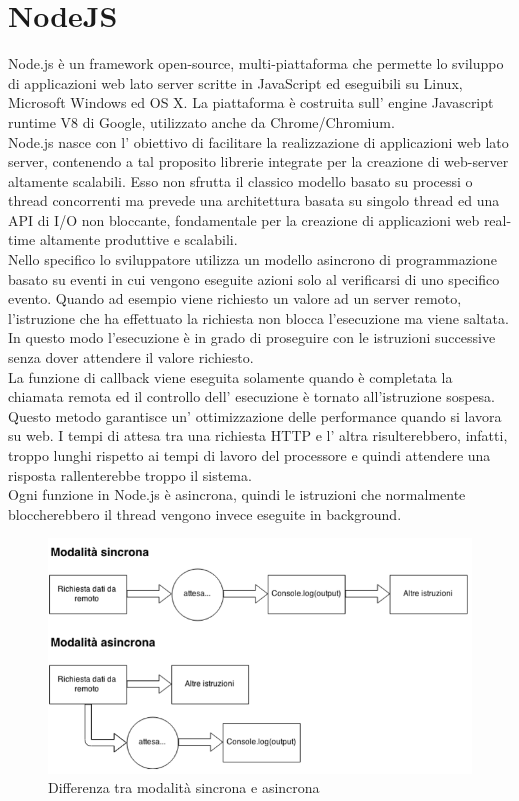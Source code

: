 \section{NodeJS}
\label{sec:chapter_tecnologie_abilitanti_nodejs}

Node.js è un framework open-source, multi-piattaforma che permette lo sviluppo di applicazioni web lato server scritte in JavaScript ed eseguibili su Linux, Microsoft Windows ed OS X.
La piattaforma è costruita sull’ engine Javascript runtime V8 di Google, utilizzato anche da Chrome/Chromium.
\\
Node.js nasce con l’ obiettivo di facilitare la realizzazione di applicazioni web lato server, contenendo a tal proposito librerie integrate per la creazione di web-server altamente scalabili.
Esso non sfrutta il classico modello basato su processi o thread concorrenti ma prevede una architettura basata su singolo thread ed una API di I/O non bloccante, fondamentale per la creazione di applicazioni web real-time altamente produttive e scalabili. \cite{node2}
\\
Nello specifico lo sviluppatore utilizza un modello asincrono di programmazione basato su eventi in cui vengono eseguite azioni solo al verificarsi di uno specifico evento. 
Quando ad esempio viene richiesto un valore ad un server remoto, l’istruzione che ha effettuato la richiesta non blocca l’esecuzione ma viene saltata.
\\
In questo modo l’esecuzione è in grado di proseguire con le istruzioni successive senza dover attendere il valore richiesto.
\\
La funzione di callback viene eseguita solamente quando è completata la chiamata remota ed il controllo dell’ esecuzione è tornato all’istruzione sospesa.
Questo metodo garantisce un’ ottimizzazione delle performance quando si lavora su web. 
I tempi di attesa tra una richiesta HTTP e l’ altra risulterebbero, infatti, troppo lunghi rispetto ai tempi di lavoro del processore e quindi attendere una risposta rallenterebbe troppo il sistema.
\\
Ogni funzione in Node.js è asincrona, quindi le istruzioni che normalmente bloccherebbero il thread vengono invece eseguite in background. \cite{node1}
\\
\begin{figure}[htb]
 \centering
 \includegraphics[width=0.9\linewidth]{images/chapter_tecnologie_abilitanti/tecnologie_abilitanti_node_mod.png}\hfill
 \caption[NodeJS: modalità sincrona e asincrona]{Differenza tra modalità sincrona e asincrona}
 \label{fig:tecnologie_abilitanti_node_mod}
\end{figure}
